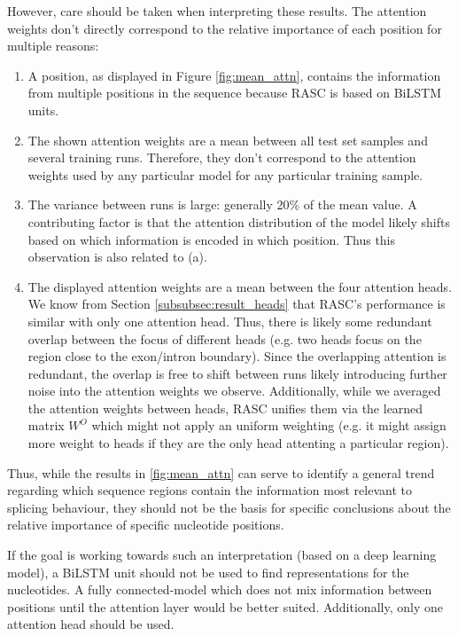 However, care should be taken when interpreting these results. The attention weights don't directly correspond to the relative importance of each position for multiple reasons: 
\begin{enumerate}[label=(\alph*)]
	\item A position, as displayed in Figure \ref{fig:mean_attn}, contains the information from multiple positions in the sequence because RASC is based on BiLSTM units.
	\item The shown attention weights are a mean between all test set samples and several training runs. Therefore, they don't correspond to the attention weights used by any particular model for any particular training sample. 
	\item The variance between runs is large: generally 20\% of the mean value. A contributing factor is that the attention distribution of the model likely shifts based on which information is encoded in which position. Thus this observation is also related to (a).
	\item The displayed attention weights are a mean between the four attention heads. We know from Section \ref{subsubsec:result_heads} that RASC's performance is similar with only one attention head. Thus, there is likely some redundant overlap between the focus of different heads (e.g. two heads focus on the region close to the exon/intron boundary). Since the overlapping attention is redundant, the overlap is free to shift between runs likely introducing further noise into the attention weights we observe. Additionally, while we averaged the attention weights between heads, RASC unifies them via the learned matrix $W^O$ which might not apply an uniform weighting (e.g. it might assign more weight to heads if they are the only head attenting a particular region). 
\end{enumerate}

Thus, while the results in \ref{fig:mean_attn} can serve to identify a general trend regarding which sequence regions contain the information most relevant to splicing behaviour, they should not be the basis for specific conclusions about the relative importance of specific nucleotide positions. 

If the goal is working towards such an interpretation (based on a deep learning model), a BiLSTM unit should not be used to find representations for the nucleotides. A fully connected-model which does not mix information between positions until the attention layer would be better suited. Additionally, only one attention head should be used. 

